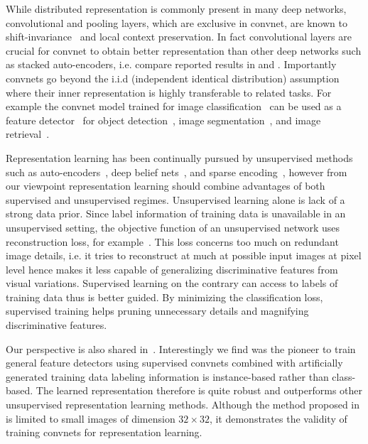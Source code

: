 \documentclass[preprint,12pt]{elsarticle}
\begin{document}
While distributed representation is commonly present in many deep networks, convolutional and pooling layers, which are exclusive in convnet, are known to shift-invariance~\cite{DBLP:journals/corr/abs-1301-3537} and local context preservation. In fact convolutional layers are crucial for convnet to obtain better representation than other deep networks such as stacked auto-encoders, i.e. compare reported results in \cite{DBLP:conf/icml/LeRMDCCDN12} and \cite{DBLP:conf/nips/KrizhevskySH12}. Importantly convnets go beyond the i.i.d (independent identical distribution) assumption where their  inner representation is highly transferable to related tasks. For example the convnet model trained for image classification~\cite{DBLP:conf/nips/KrizhevskySH12} can be used as a feature detector~\cite{DBLP:journals/corr/RazavianASC14} for object detection~\cite{DBLP:conf/cvpr/ErhanSTA14}, image segmentation~\cite{DBLP:journals/corr/LongSD14}, and image retrieval~\cite{DBLP:conf/eccv/BabenkoSCL14,DBLP:conf/cvpr/WangSLRWPCW14}. 

Representation learning has been continually pursued by unsupervised methods such as auto-encoders~\cite{hinton2006reducing}, deep belief nets~\cite{DBLP:journals/neco/HintonOT06}, and sparse encoding~\cite{poultney2006efficient}, however from our viewpoint representation learning should combine advantages of both supervised and unsupervised regimes. Unsupervised learning alone is lack of a strong data prior. Since label information of training data is unavailable in an unsupervised setting, the objective function of an unsupervised network uses reconstruction loss, for example~\cite{hinton2006reducing}. This loss concerns too much on redundant image details, i.e. it tries to reconstruct at much at possible input images at pixel level hence  makes it less capable of generalizing discriminative features from visual variations. Supervised learning on the contrary can access to labels of training data thus is better guided. By minimizing the classification loss, supervised training helps pruning unnecessary details and magnifying discriminative features. 

Our perspective is also shared in~\cite{DBLP:conf/nips/DosovitskiySRB14,DBLP:journals/corr/Valpola14,DBLP:journals/corr/RasmusVHBR15}. Interestingly we find \cite{DBLP:conf/nips/DosovitskiySRB14}  was the pioneer to train general feature detectors using supervised convnets combined with artificially generated training data labeling information is instance-based rather than class-based. The learned representation therefore is quite robust and outperforms other unsupervised representation learning methods. Although the method proposed in \cite{DBLP:conf/nips/DosovitskiySRB14} is limited to small images of dimension $32\times 32$, it demonstrates the validity of training convnets for representation learning.
\end{document}
